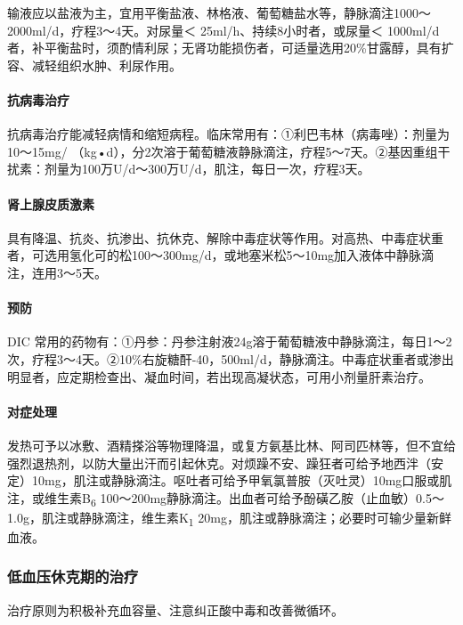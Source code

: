 输液应以盐液为主，宜用平衡盐液、林格液、葡萄糖盐水等，静脉滴注1000～2000ml/d，疗程3～4天。对尿量＜
25ml/h、持续8小时者，或尿量＜
1000ml/d者，补平衡盐时，须酌情利尿；无肾功能损伤者，可适量选用20\%甘露醇，具有扩容、减轻组织水肿、利尿作用。

\paragraph{抗病毒治疗}

抗病毒治疗能减轻病情和缩短病程。临床常用有：①利巴韦林（病毒唑）：剂量为10～15mg/
（kg•d），分2次溶于葡萄糖液静脉滴注，疗程5～7天。②基因重组干扰素：剂量为100万U/d～300万U/d，肌注，每日一次，疗程3天。

\paragraph{肾上腺皮质激素}

具有降温、抗炎、抗渗出、抗休克、解除中毒症状等作用。对高热、中毒症状重者，可选用氢化可的松100～300mg/d，或地塞米松5～10mg加入液体中静脉滴注，连用3～5天。

\paragraph{预防}

DIC
常用的药物有：①丹参：丹参注射液24g溶于葡萄糖液中静脉滴注，每日1～2次，疗程3～4天。②10\%右旋糖酐-40，500ml/d，静脉滴注。中毒症状重者或渗出明显者，应定期检查出、凝血时间，若出现高凝状态，可用小剂量肝素治疗。

\paragraph{对症处理}

发热可予以冰敷、酒精搽浴等物理降温，或复方氨基比林、阿司匹林等，但不宜给强烈退热剂，以防大量出汗而引起休克。对烦躁不安、躁狂者可给予地西泮（安定）10mg，肌注或静脉滴注。呕吐者可给予甲氧氯普胺（灭吐灵）10mg口服或肌注，或维生素B\textsubscript{6}
100～200mg静脉滴注。出血者可给予酚磺乙胺（止血敏）0.5～1.0g，肌注或静脉滴注，维生素K\textsubscript{1}
20mg，肌注或静脉滴注；必要时可输少量新鲜血液。

\subsubsection{低血压休克期的治疗}

治疗原则为积极补充血容量、注意纠正酸中毒和改善微循环。

